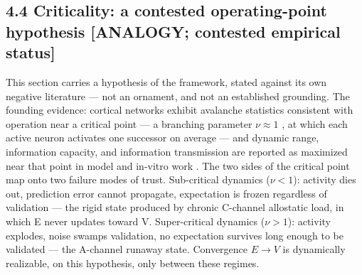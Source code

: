 \documentclass[
]{article}
\begin{document}
\subsection{4.4 Criticality: a contested operating-point hypothesis
{[}ANALOGY; contested empirical
status{]}}\label{criticality-a-contested-operating-point-hypothesis-analogy-contested-empirical-status}

This section carries a hypothesis of the framework, stated against its
own negative literature --- not an ornament, and not an established
grounding. The founding evidence: cortical networks exhibit avalanche
statistics consistent with operation near a critical point --- a
branching parameter \(\nu \approx 1\) , at which each active neuron
activates one successor on average --- and dynamic range, information
capacity, and information transmission are reported as maximized near
that point in model and in-vitro work . The two sides of the critical
point map onto two failure modes of trust. Sub-critical dynamics
(\(\nu < 1\)): activity dies out, prediction error cannot propagate,
expectation is frozen regardless of validation --- the rigid state
produced by chronic C-channel allostatic load, in which E never updates
toward V. Super-critical dynamics (\(\nu > 1\)): activity explodes,
noise swamps validation, no expectation survives long enough to be
validated --- the A-channel runaway state. Convergence \(E \to V\) is
dynamically realizable, on this hypothesis, only between these regimes.
\end{document}
